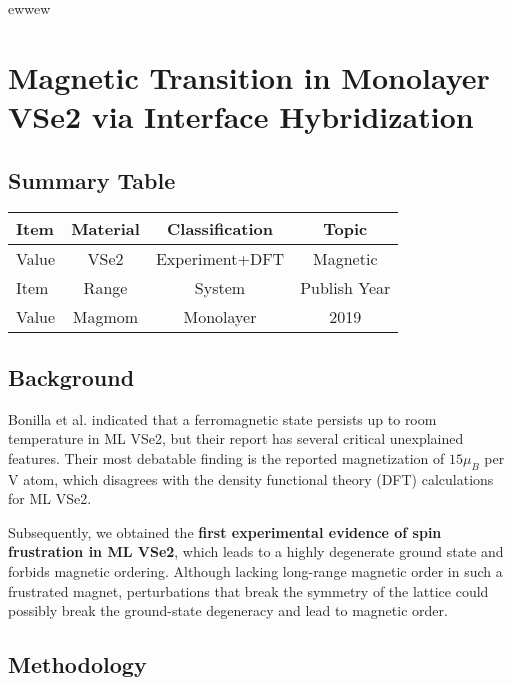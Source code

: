 ewwew\setchapterpreamble[u]{\margintoc}
\chapter{Magnetic Transition in Monolayer VSe2 via Interface Hybridization\cite{doi:10.1021/acsnano.9b02996}}

\section{Summary Table}

\begin{table}[h]
    \begin{tabular}{lccc}
    \hline
    Item  & Material         & Classification & Topic        \\  \hline
    Value & VSe2             & Experiment+DFT & Magnetic     \\  \hline
    Item  & Range            & System         & Publish Year \\  \hline
    Value & Magmom           & Monolayer      & 2019         \\  \hline
    \end{tabular}
\end{table}

\section{Background}
Bonilla et al. indicated that a ferromagnetic state persists up to room temperature in ML VSe2, but their report has several critical unexplained features. Their most debatable finding is the reported magnetization of $15 \mu_B$ per V atom, which disagrees with the density functional theory (DFT) calculations for ML VSe2.

Subsequently, we obtained the \textbf{first experimental evidence of spin frustration in ML VSe2}, which leads to a highly degenerate ground state and forbids magnetic ordering. Although lacking long-range magnetic order in such a frustrated magnet, perturbations that break the symmetry of the lattice could possibly break the ground-state degeneracy and lead to magnetic order.

\section{Methodology}

